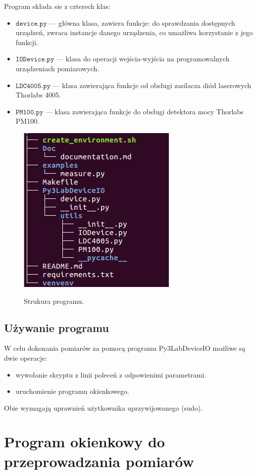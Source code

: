 \documentclass[a4paper, portrait,12pt]{mwrep}
\begin{document}
Program składa sie z czterech klas:
\begin{itemize}
\item $\mathtt{device.py}$ --- główna klasa, zawiera funkcje: do sprawdzania dostępnych urządzeń, 
zwraca instancje danego urządzenia, co umażliwa korzystanie z jego funkcji. 
\item $\mathtt{IODevice.py}$ --- klasa do operacji wejścia-wyjścia na programowalnych urządzeniach pomiarowych.
\item $\mathtt{LDC4005.py}$ --- klasa zawierająca funkcje od obsługi zasilacza diód laserowych Thorlabs 4005.
\item $\mathtt{PM100.py}$ --- klasa zawierająca funkcje do obsługi detektora mocy Thorlabs PM100.
\end{itemize}
\begin{figure}[h]
\center
  \includegraphics[scale=0.45]{tree.png}
  \label{rys1}
  \caption{Strukura programu.} 
\end{figure}
\section{Używanie programu}
W celu dokonania pomiarów za pomocą programu Py3LabDeviceIO możliwe są dwie operacje:
\begin{itemize}
\item wywołanie skryptu z linii poleceń z odpowienimi parametrami.
\item uruchomienie programu okienkowego.
\end{itemize}
Obie wymagają uprawnień użytkownika uprzywijowanego (sudo).
\newpage
\chapter{Program okienkowy do przeprowadzania pomiarów}
\end{document}
